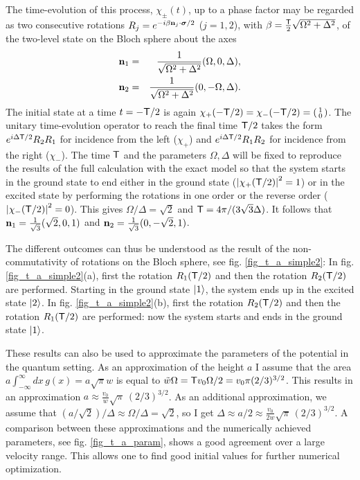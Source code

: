 The time-evolution of this process, $\chi_\pm (t)$,
up to a phase factor may be regarded as
two consecutive rotations $R_j=e^{-i{\beta}{\bf n}_j\cdot {\boldsymbol{\sigma}}/2}$ ($j=1,2$), with $\beta=\frac{{\sf T}}{2}\sqrt{\Omega^2+\Delta^2}$, of the two-level state on the Bloch sphere about the axes
%
\begin{eqnarray}
  {\bf n}_1&=&\frac{1}{\sqrt{\Omega^2+\Delta^2}}(\Omega,0,\Delta), %
  \\
  {\bf n}_2&=&\frac{1}{\sqrt{\Omega^2+\Delta^2}}(0,-\Omega,\Delta). %
\end{eqnarray}
%
The initial state at a time $t=-{\sf T}/2$ is again $\chi_+ (-{\sf T}/2) = \chi_- (-{\sf T}/2) =\left(\begin{smallmatrix} 1\\ 0\end{smallmatrix}\right)$.
The unitary time-evolution operator to reach the final time ${\sf T}/2$ takes the form
$e^{i\Delta {\sf T}/2}R_2 R_1$ for  incidence from the left ($\chi_+$) and
$e^{i\Delta {\sf T}/2}R_1 R_2$ for incidence from the right ($\chi_-$).
The time ${\sf T}$ and the parameters $\Omega, \Delta$ will be fixed to reproduce the results of the full calculation with the exact model so that the system starts in the ground state to end either in the ground state
($\left| \chi_{+} ({\sf T}/2) \right|^2 = 1$)
or in the excited state by performing the rotations in one order or the reverse order
($\left| \chi_{-} ({\sf T}/2) \right|^2 = 0$). This gives $\Omega/\Delta = \sqrt{2}$ and ${\sf T}= 4\pi/(3 \sqrt{3} \Delta)$. It follows that ${\bf n}_1=\frac{1}{\sqrt{3}}(\sqrt{2},0,1)$ and ${\bf n}_2=\frac{1}{\sqrt{3}}(0,-\sqrt{2},1)$.

The different outcomes can thus be understood as the result of the \linebreak non-commutativity of rotations on the Bloch sphere, see
fig. \ref{fig_t_a_simple2}: In fig. \ref{fig_t_a_simple2}(a), first the rotation $R_1({\sf T}/2)$ and then the rotation $R_2({\sf T}/2)$ are performed. Starting in the ground state $\ket{1}$, the system ends up  in the excited state $\ket{2}$.
In fig. \ref{fig_t_a_simple2}(b),  first the rotation $R_2({\sf T}/2)$ and then the rotation $R_1({\sf T}/2)$ are performed:  now the system starts and ends  in the ground state $\ket{1}$.

These results can also be used to approximate the parameters of the potential in the quantum setting.
As an approximation of the height $a$ I assume that the area $a \int_{-\infty}^\infty dx \, g(x) = a \sqrt{\pi} w$
is equal to $\tilde w \Omega = {{\sf T}} v_0 \Omega/2 =
v_0 \pi ({2}/{3})^{3/2}$. This results in an
approximation $a \approx \frac{v_0}{w} \sqrt{\pi}\, ({2}/{3})^{3/2}$. As an additional approximation, we
assume that $(a/\sqrt{2})/\Delta \approx {\Omega}/{\Delta} = \sqrt{2}$, so I get
$\Delta \approx a/2 \approx \frac{v_0}{2 w} \sqrt{\pi}\, ({2}/{3})^{3/2}$. A comparison between
these approximations and the numerically achieved parameters, see fig. \ref{fig_t_a_param}, shows a good agreement
over a large velocity range. This allows one to find good initial values for further numerical optimization.

